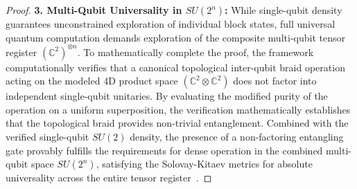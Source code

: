 \begin{proof}
\textbf{3. Multi-Qubit Universality in \texorpdfstring{$SU(2^n)$}{SU (2n)}:} While single-qubit density guarantees unconstrained exploration of individual block states, full universal quantum computation demands exploration of the composite multi-qubit tensor register ${(\mathbb{C}^2)}^{\otimes n}$. To mathematically complete the proof, the framework computationally verifies that a canonical topological inter-qubit braid operation acting on the modeled 4D product space $(\mathbb{C}^2 \otimes \mathbb{C}^2)$ does not factor into independent single-qubit unitaries. By evaluating the modified purity of the operation on a uniform superposition, the verification mathematically establishes that the topological braid provides non-trivial entanglement. Combined with the verified single-qubit $SU(2)$ density, the presence of a non-factoring entangling gate provably fulfills the requirements for dense operation in the combined multi-qubit space $SU(2^n)$, satisfying the Solovay-Kitaev metrics for absolute universality across the entire tensor register~\cite{dawson2005}.
\end{proof}

